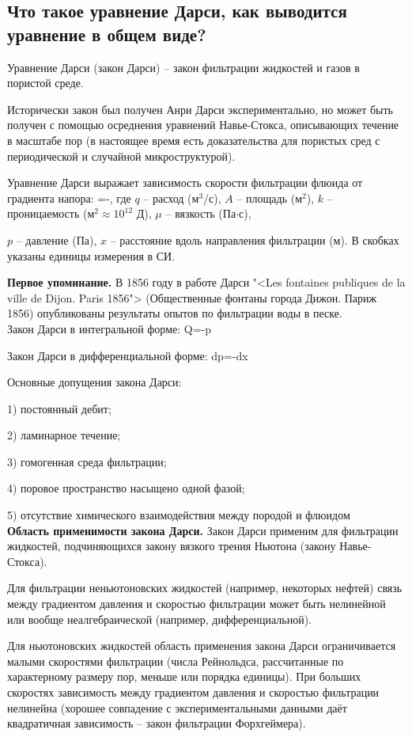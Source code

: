 

\subsection{Что такое уравнение Дарси, как выводится уравнение в общем виде?}

Уравнение Дарси (закон Дарси) -- закон фильтрации жидкостей и газов в пористой среде.

Исторически закон был получен Анри Дарси экспериментально, но может быть получен с помощью осреднения уравнений Навье-Стокса, описывающих течение в масштабе пор (в настоящее время есть доказательства для пористых сред с периодической и случайной микроструктурой).

Уравнение Дарси выражает зависимость скорости фильтрации флюида от градиента напора:
\beq
{}=-,
\eeq
где $q$ -- расход (м$^3$/с), $A$ -- площадь (м$^2$), $k$ -- проницаемость (м$^2\approx 10^{12}$ Д), $\mu$ -- вязкость (Па$\cdot$с),

$p$ -- давление (Па), $x$ -- расстояние вдоль направления фильтрации (м).
В скобках указаны единицы измерения в СИ.

\textbf{Первое упоминание.}
В 1856 году в работе Дарси "<Les fontaines publiques de la ville de Dijon. Paris 1856"> (Общественные фонтаны города Дижон. Париж 1856) опубликованы результаты опытов по фильтрации воды в песке.
\\

Закон Дарси в интегральной форме:
\beq
Q=-\Delta p
\eeq

Закон Дарси в дифференциальной форме:
\beq\label{DiffDarcyExam}
dp=-dx
\eeq

Основные допущения закона Дарси:

1) постоянный дебит;

2) ламинарное течение;

3) гомогенная среда фильтрации;

4) поровое пространство насыщено одной фазой;

5) отсутствие химического взаимодействия между породой и флюидом
\\

\textbf{Область применимости закона Дарси.}
Закон Дарси применим для фильтрации жидкостей, подчиняющихся закону вязкого трения Ньютона (закону Навье-Стокса).

Для фильтрации неньютоновских жидкостей (например, некоторых нефтей) связь между градиентом давления и скоростью фильтрации может быть нелинейной или вообще неалгебраической (например, дифференциальной).

Для ньютоновских жидкостей область применения закона Дарси ограничивается малыми скоростями фильтрации (числа Рейнольдса, рассчитанные по характерному размеру пор, меньше или порядка единицы).
При больших скоростях зависимость между градиентом давления и скоростью фильтрации нелинейна (хорошее совпадение с экспериментальными данными даёт квадратичная зависимость -- закон фильтрации Форхгеймера).

